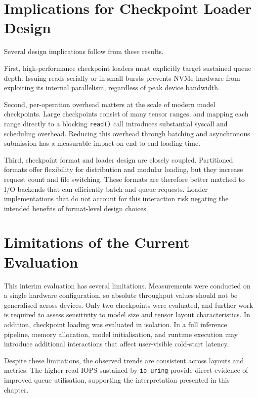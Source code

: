 \documentclass[]{final_report}
\begin{document}
\section{Implications for Checkpoint Loader Design}

Several design implications follow from these results.

First, high-performance checkpoint loaders must explicitly target sustained queue depth. Issuing reads serially or in small bursts prevents NVMe hardware from exploiting its internal parallelism, regardless of peak device bandwidth.

Second, per-operation overhead matters at the scale of modern model checkpoints. Large checkpoints consist of many tensor ranges, and mapping each range directly to a blocking \texttt{read()} call introduces substantial syscall and scheduling overhead. Reducing this overhead through batching and asynchronous submission has a measurable impact on end-to-end loading time.

Third, checkpoint format and loader design are closely coupled. Partitioned formats offer flexibility for distribution and modular loading, but they increase request count and file switching. These formats are therefore better matched to I/O backends that can efficiently batch and queue requests. Loader implementations that do not account for this interaction risk negating the intended benefits of format-level design choices.

\section{Limitations of the Current Evaluation}

This interim evaluation has several limitations. Measurements were conducted on a single hardware configuration, so absolute throughput values should not be generalised across devices. Only two checkpoints were evaluated, and further work is required to assess sensitivity to model size and tensor layout characteristics. In addition, checkpoint loading was evaluated in isolation. In a full inference pipeline, memory allocation, model initialisation, and runtime execution may introduce additional interactions that affect user-visible cold-start latency.

Despite these limitations, the observed trends are consistent across layouts and metrics. The higher read IOPS sustained by \texttt{io\_uring} provide direct evidence of improved queue utilisation, supporting the interpretation presented in this chapter.
\end{document}
